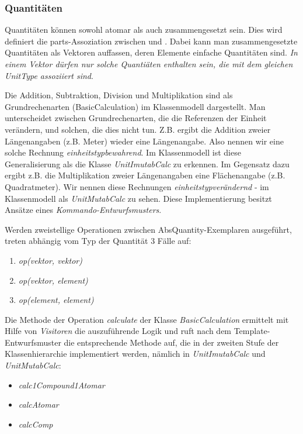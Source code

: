 \subsubsection{Quantitäten}\label{Quantitaeten}


Quantitäten können sowohl atomar als auch zusammengesetzt sein.
Dies wird definiert die parts-Assoziation zwischen  und . 
Dabei kann man zusammengesetzte Quantitäten als Vektoren auffassen, deren Elemente einfache Quantitäten sind. 
\emph{In einem Vektor dürfen nur solche Quantiäten enthalten sein, die mit dem gleichen UnitType assoziiert sind}. 

\label{Berechnungen}

Die Addition, Subtraktion, Division und Multiplikation sind als Grundrechenarten (BasicCalculation) im Klassenmodell dargestellt. Man unterscheidet zwischen Grundrechenarten, die die Referenzen der Einheit verändern, und solchen, die dies nicht tun. Z.B. ergibt die Addition zweier Längenangaben (z.B. Meter) wieder eine Längenangabe. Also nennen wir eine solche Rechnung \emph{einheitstypbewahrend}. Im Klassenmodell ist diese Generalisierung als die Klasse \textit{UnitImutabCalc} zu erkennen. Im Gegensatz dazu ergibt z.B. die Multiplikation zweier Längenangaben eine Flächenangabe (z.B. Quadratmeter). Wir nennen diese Rechnungen \emph{einheitstypverändernd} - im Klassenmodell als \textit{UnitMutabCalc} zu sehen. Diese Implementierung besitzt Ansätze eines \emph{Kommando-Entwurfsmusters}.


Werden zweistellige Operationen zwischen AbsQuantity-Exemplaren ausgeführt, treten abhängig vom Typ der Quantität 3 Fälle auf:
\begin{enumerate}
\item \textit{op(vektor, vektor)}
\item \textit{op(vektor, element)}
\item \textit{op(element, element)}
\end{enumerate}

Die Methode der Operation \textit{calculate} der Klasse \textit{BasicCalculation} ermittelt mit Hilfe von \emph{Visitoren} die auszuführende Logik und ruft nach dem Template-Entwurfsmuster die entsprechende Methode auf, die in der zweiten Stufe der Klassenhierarchie implementiert werden, nämlich in \textit{UnitImutabCalc} und \textit{UnitMutabCalc}:
\begin{itemize}
\item \textit{calc1Compound1Atomar}
\item \textit{calcAtomar}
\item \textit{calcComp}
\end{itemize}

